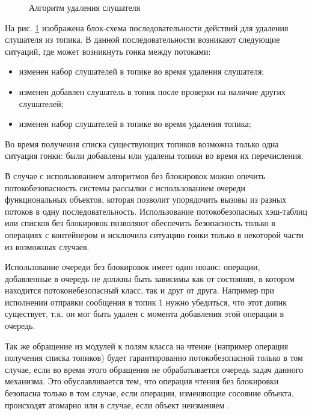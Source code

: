 \begin{figure}[h]
	\caption{Алгоритм удаления слушателя}
	\label{im:2_2_6_remove_listener}
\end{figure}

На рис. \ref{im:2_2_6_remove_listener} изображена блок-схема последовательности действий для удаления слушателя из топика. В данной последовательности возникают следующие ситуаций, где может возникнуть гонка между потоками:

\begin{itemize}
	\item изменен набор слушателей в топике во время удаления слушателя;
	\item изменен добавлен слушатель в топик после проверки на наличие других слушателей;
	\item изменен набор слушателей в топике во время удаления топика;
\end{itemize}

Во время получения списка существующих топиков возможна только одна ситуация гонки: были добавлены или удалены топики во время их перечисления.

В случае с использованием алгоритмов без блокировок можно опечить потокобезопасность системы рассылки с использованием очереди функциональных объектов, которая позволит упорядочить вызовы из разных потоков в одну последовательность. Использование потокобезопасных хэш-таблиц или списков без блокировок позволяют обеспечить безопасность только в операциях с контейнером и исключила ситуацию гонки только в некоторой части из возможных случаев. 

Использование очереди без блокировок имеет один нюанс: операции, добавленные в очередь не должны быть зависимы как от состояния, в котором находится потоконебезопасный класс, так и друг от друга. Например при исполнении отправки сообщения в топик 1 нужно убедиться, что этот допик существует, т.к. он мог быть удален с момента добавления этой операции в очередь.

Так же обращение из модулей к полям класса на чтение (например операция получения списка топиков) будет гарантированно потокобезопасной только в том случае, если во время этого обращения не обрабатывается очередь задач данного механизма. Это обуславливается тем, что операция чтения без блокировки безопасна только в том случае, если операции, изменяющие сосояние объекта, происходят атомарно  или в случае, если объект неизменяем \cite{williams2012c++}.

